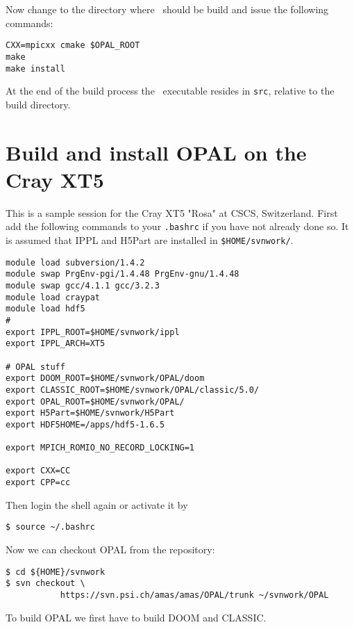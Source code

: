 Now change to the directory where \opal\ should be build and issue the following commands:
\begin{footnotesize}
\begin{verbatim}
CXX=mpicxx cmake $OPAL_ROOT
make 
make install 
\end{verbatim}
\end{footnotesize}
At the end of the build process the \opal\ executable resides in {\tt src}, relative to the build directory.

\section{Build and install OPAL on the Cray XT5}
This is a sample session for the Cray XT5 "Rosa" at CSCS, Switzerland. First add the following commands to your {\tt .bashrc} if
you have not already done so. It is assumed that IPPL and H5Part are installed in {\tt \${HOME}/svnwork/}.

\begin{footnotesize}
\begin{verbatim}
module load subversion/1.4.2
module swap PrgEnv-pgi/1.4.48 PrgEnv-gnu/1.4.48
module swap gcc/4.1.1 gcc/3.2.3
module load craypat
module load hdf5
#
export IPPL_ROOT=$HOME/svnwork/ippl
export IPPL_ARCH=XT5

# OPAL stuff
export DOOM_ROOT=$HOME/svnwork/OPAL/doom
export CLASSIC_ROOT=$HOME/svnwork/OPAL/classic/5.0/
export OPAL_ROOT=$HOME/svnwork/OPAL/
export H5Part=$HOME/svnwork/H5Part
export HDF5HOME=/apps/hdf5-1.6.5

export MPICH_ROMIO_NO_RECORD_LOCKING=1

export CXX=CC
export CPP=cc
\end{verbatim}
\end{footnotesize}

Then login the shell again or activate it by 
\begin{footnotesize}
\begin{verbatim}
$ source ~/.bashrc
\end{verbatim}
\end{footnotesize}
Now we can checkout OPAL from the repository: 

\begin{footnotesize}
\begin{verbatim}
$ cd ${HOME}/svnwork
$ svn checkout \
           https://svn.psi.ch/amas/amas/OPAL/trunk ~/svnwork/OPAL
\end{verbatim}
\end{footnotesize}
To build OPAL we first have to build DOOM and CLASSIC. 

